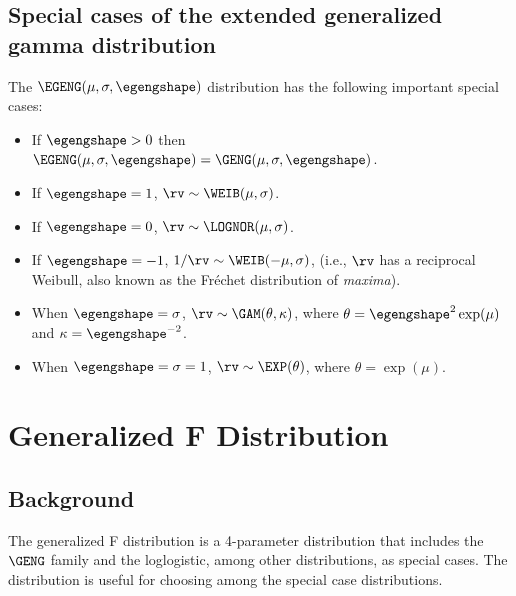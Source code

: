 \subsection{Special cases of the extended generalized gamma distribution}
The $\EGENG(\mu,\sigma,\egengshape)$ distribution has the following
important special cases: 
\begin{itemize}
\item
If $\egengshape>0$ then $\EGENG(\mu,\sigma,\egengshape)=\GENG(\mu,\sigma,\egengshape)$.
\item
If $\egengshape=1$,
$\rv \sim \WEIB(\mu,\sigma)$. 
\item
If $\egengshape=0$,
$\rv \sim \LOGNOR(\mu,\sigma)$. 
\item
If $\egengshape=-1$,
$1/\rv \sim \WEIB(-\mu,\sigma)$, 
(i.e., $\rv$ has a reciprocal Weibull, also known as the 
Fr\'echet distribution of {\em maxima}).
\item 
When $\egengshape=\sigma$, 
$\rv \sim \GAM(\theta,\kappa)$, where 
$\theta=\egengshape^{2} \exp(\mu)$
and $\kappa=\egengshape^{-2}$.
\item
When $\egengshape=\sigma=1$,
$\rv \sim \EXP(\theta)$, where
 $\theta= \exp(\mu)$.	
\end{itemize}

\section{Generalized F Distribution}
\label{section:gen.f}
\subsection{Background}
The generalized F distribution is a 4-parameter distribution
that includes the $\GENG$ family and the loglogistic, among other
distributions, as special cases. The distribution is useful for
choosing among the special case distributions.

